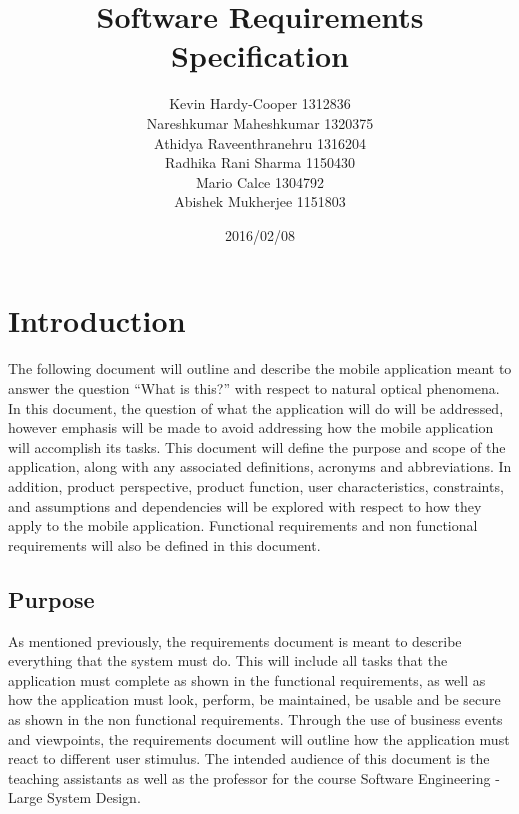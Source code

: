 \documentclass[]{article}
\begin{document}
\begin{titlepage}

\title{Software Requirements Specification}
\author{Kevin Hardy-Cooper 1312836\\
		Nareshkumar Maheshkumar 1320375\\
		Athidya Raveenthranehru 1316204\\
		Radhika Rani Sharma	1150430\\
		Mario Calce 1304792\\
		Abishek Mukherjee 1151803 }
\date{2016/02/08}

\maketitle

\end{titlepage}
\tableofcontents                  \newpage    

	

\section{Introduction}
\label{sec:introduction}


 The following document will outline and describe the mobile application meant to answer the question ``What is this?'' with respect to natural optical phenomena.  In this document, the question of what the application will do will be addressed, however emphasis will be made to avoid addressing how the mobile application will accomplish its tasks. This document will define the purpose and scope of the application, along with any associated definitions, acronyms and abbreviations. In addition, product perspective, product function, user characteristics, constraints, and assumptions and dependencies will be explored with respect to how they apply to the mobile application. Functional requirements and non functional requirements will also be defined in this document.

\subsection{Purpose}
\label{sub:purpose}

 As mentioned previously, the requirements document is meant to describe everything that the system must do. This will include all tasks that the application must complete as shown in the functional requirements, as well as how the application must look, perform, be maintained, be usable and be secure as shown in the non functional requirements. Through the use of business events and viewpoints, the requirements document will outline how the application must react to different user stimulus. The intended audience of this document is the teaching assistants as well as the professor for the course Software Engineering - Large System Design. 
\end{document}
